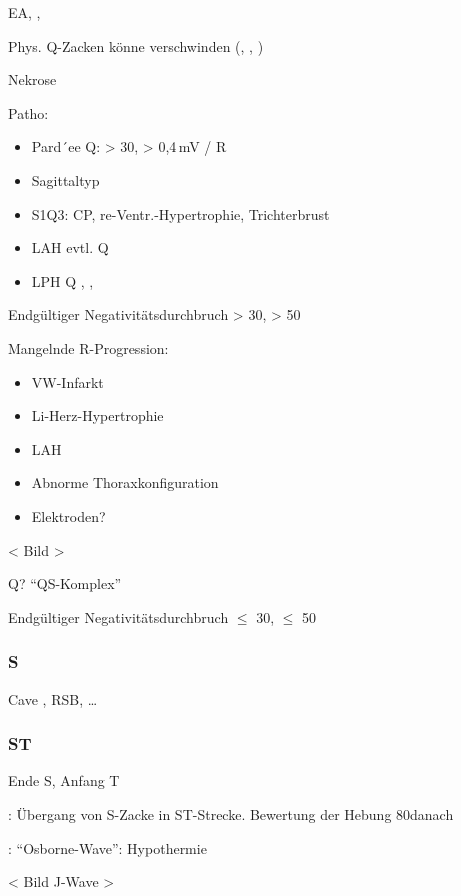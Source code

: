 EA, , 
 

Phys. Q-Zacken könne verschwinden (, , )

Nekrose

Patho:
\begin{itemize}
  \item Pard´ee Q: > 30, > 0,4\,mV /  R
  \item Sagittaltyp
  \item S1Q3: CP, re-Ventr.-Hypertrophie, Trichterbrust
  \item LAH evtl. Q 
  \item LPH Q , , 
\end{itemize}

Endgültiger Negativitätsdurchbruch  > 30\MS*,  > 50\MS*

Mangelnde R-Progression:

\begin{itemize}
  \item VW-Infarkt
  \item Li-Herz-Hypertrophie
  \item LAH
  \item Abnorme Thoraxkonfiguration
  \item Elektroden?
\end{itemize}

< Bild >

Q?  \enquote{QS-Komplex}

Endgültiger Negativitätsdurchbruch  $\leq$ 30\MS*,  $\leq$ 50\MS*

\subsubsection{S}

Cave , RSB, \ldots

\subsubsection{ST}

Ende S, Anfang T

: Übergang von S-Zacke in ST-Strecke. Bewertung der Hebung 80\MS* danach

: \enquote{Osborne-Wave}: Hypothermie

< Bild J-Wave >

\, 

